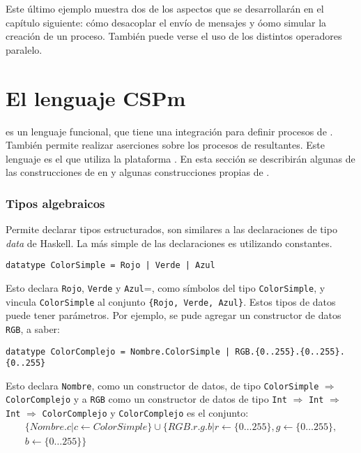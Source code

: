 Este último ejemplo muestra dos de los aspectos que se desarrollarán en el capítulo siguiente: cómo desacoplar el envío de mensajes y óomo simular la creación de un proceso. También puede verse el uso de los distintos operadores paralelo.
 
\section{El lenguaje CSPm}

\CSPm es un lenguaje funcional, que tiene una integración para definir procesos de \CSP. También permite realizar aserciones sobre los procesos de \CSP resultantes. Este lenguaje es el que utiliza la plataforma \FDR. En esta sección se describirán algunas de las construcciones de \CSP en \CSPm y algunas construcciones propias de \CSPm.

\subsubsection{Tipos algebraicos}

Permite declarar tipos estructurados, son similares a las declaraciones de tipo \textit{data} de Haskell. La más simple de las declaraciones es utilizando constantes.

\begin{verbatim}
datatype ColorSimple = Rojo | Verde | Azul
\end{verbatim}

Esto declara \verb=Rojo=, \verb=Verde= y \verb=Azul==, como símbolos del tipo \verb=ColorSimple=, y vincula \verb=ColorSimple= al conjunto \verb={Rojo, Verde, Azul}=. Estos tipos de datos puede tener parámetros. Por ejemplo, se pude agregar un constructor de datos \verb=RGB=, a saber:

\begin{verbatim}
datatype ColorComplejo = Nombre.ColorSimple | RGB.{0..255}.{0..255}.{0..255}
\end{verbatim}

Esto declara \verb=Nombre=, como un constructor de datos, de tipo \verb=ColorSimple= $\Rightarrow$ \verb$ColorComplejo$ y a \verb$RGB$ como un constructor de datos de tipo \verb$Int$ $\Rightarrow$ \verb$Int$ $\Rightarrow$ \verb$Int$ $\Rightarrow$ \verb$ColorComplejo$ y \verb$ColorComplejo$ es el conjunto:
\begin{multline*}
\{ Nombre.c | c \leftarrow  ColorSimple \} \cup \{ RGB.r.g.b |  r \leftarrow \{ 0 \dots 255 \},  g \leftarrow \{ 0 \dots 255 \}, \\  b \leftarrow \{ 0 \dots 255 \} \}  
\end{multline*}

